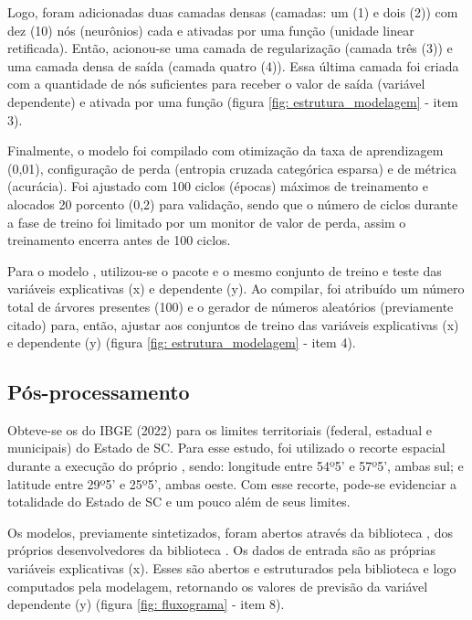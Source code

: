 \indent Logo, foram adicionadas duas camadas densas (camadas: um (1) e dois (2)) com dez (10) nós (neurônios) cada e ativadas por uma função  (unidade linear retificada). Então, acionou-se uma camada de regularização (camada três (3)) e uma camada densa de saída (camada quatro (4)). Essa última camada foi criada com a quantidade de nós suficientes para receber o valor de saída (variável dependente) e ativada por uma função  (figura \ref{fig: estrutura_modelagem} - item 3).

\indent Finalmente, o modelo foi compilado com otimização da taxa de aprendizagem (0,01), configuração de perda (entropia cruzada categórica esparsa) e de métrica (acurácia). Foi ajustado com 100 ciclos (épocas) máximos de treinamento e alocados 20 porcento (0,2) para validação, sendo que o número de ciclos durante a fase de treino foi limitado por um monitor de valor de perda, assim o treinamento encerra antes de 100 ciclos.

\indent Para o modelo , utilizou-se o pacote  e o mesmo conjunto de treino e teste das variáveis explicativas (x) e dependente (y). Ao compilar, foi atribuído um número total de árvores presentes (100) e o gerador de números aleatórios (previamente citado) para, então, ajustar aos conjuntos de treino das variáveis explicativas (x) e dependente (y) (figura \ref{fig: estrutura_modelagem} - item 4).

\subsection{Pós-processamento}

\indent Obteve-se os  do \acrshort{IBGE} (2022) para os limites territoriais (federal, estadual e municipais) do Estado de \acrlong{SC}. Para esse estudo, foi utilizado o recorte espacial durante a execução do próprio , sendo: longitude entre 54º5' e 57º5', ambas sul; e latitude entre 29º5' e 25º5', ambas oeste. Com esse recorte, pode-se evidenciar a totalidade do Estado de \acrlong{SC} e um pouco além de seus limites.

\indent Os modelos, previamente sintetizados, foram abertos através da biblioteca , dos próprios desenvolvedores da biblioteca . Os dados de entrada são as próprias variáveis explicativas (x). Esses são abertos e estruturados pela biblioteca  e logo computados pela modelagem, retornando os valores de previsão da variável dependente (y) (figura \ref{fig: fluxograma} - item 8).

